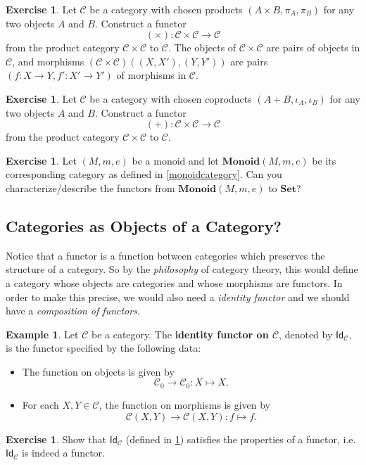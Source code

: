 \documentclass[a4paper,10pt]{scrartcl}
\theoremstyle{plain}
\theoremstyle{definition}
\newtheorem{exa}[thm]{Example}
\newtheorem{exer}[thm]{Exercise}
\newcommand{\cfont}[1]{\ensuremath{\mathsf{#1}}}
\newcommand{\Cat}[1]{\mathcal{#1}}
\newcommand{\CC}{\Cat{C}}
\newcommand{\Catb}[1]{\mathbf{#1}}
\newcommand{\SET}{\Catb{Set}}
\newcommand{\MON}{\Catb{Monoid}}
\newcommand{\Ob}[1]{{#1}_0}
\newcommand{\CHom}[3]{{#1}(#2,#3)}
\newcommand{\Id}[1][]{\cfont{Id}_{#1}}
\begin{document}
\begin{exer}
  Let $\CC$ be a category with chosen products $(A\times B, \pi_A, \pi_B)$ for any two objects $A$ and $B$.
  Construct a functor
  \[ (\times) : \CC\times \CC \to \CC\]
  from the product category $\CC\times \CC$ to $\CC$.
  The objects of $\CC\times \CC$ are pairs of objects in $\CC$, and morphisms $\CHom{(\CC\times\CC)}{(X,X')}{(Y,Y')}$ are pairs $(f : X \to Y, f' : X' \to Y')$ of morphisms in $\CC$.
\end{exer}

\begin{exer}
  Let $\CC$ be a category with chosen coproducts $(A + B, \iota_A, \iota_B)$ for any two objects $A$ and $B$.
  Construct a functor
  \[ (+) : \CC\times \CC \to \CC\]
  from the product category $\CC\times \CC$ to $\CC$.
\end{exer}


\begin{exer}\label{ex:monoid_functors} Let $(M,m,e)$ be a monoid and let $\MON(M,m,e)$ be its corresponding category as defined in \cref{monoidcategory}. Can you characterize/describe the functors from $\MON(M,m,e)$ to $\SET$?
\end{exer}

\subsection{Categories as Objects of a Category?}
Notice that a functor is a function between categories which preserves the structure of a category. So by the \textit{philosophy} of category theory, this would define a category whose objects are categories and whose morphisms are functors. In order to make this precise, we would also need a \textit{identity functor} and we should have a \textit{composition of functors}.

\begin{exa}\label{example:functor_id} Let $\CC$ be a category. The \textbf{identity functor on $\CC$}, denoted by $\Id[\CC]$, is the functor specified by the following data:
\begin{itemize}
\item The function on objects is given by
\[
\Ob{\CC}\to \Ob{\CC}: X\mapsto X.
\]
\item For each $X,Y\in\CC$, the function on morphisms is given by
\[
\CHom \CC X Y\to \CHom \CC X Y: f\mapsto f.
\]
\end{itemize}
\end{exa}

\begin{exer} Show that $\Id[\CC]$ (defined in \cref{example:functor_id}) satisfies the properties of a functor, i.e. $\Id[\CC]$ is indeed a functor.
\end{exer}
\end{document}
